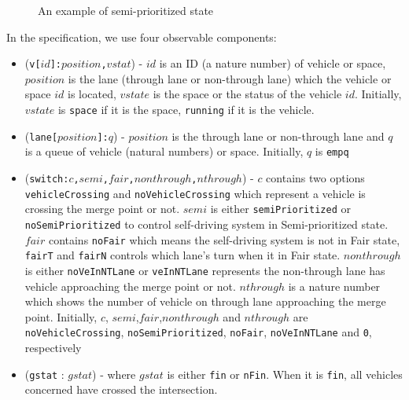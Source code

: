 \documentclass[10pt, conference, compsocconf]{IEEEtran}
\begin{document}
\begin{figure}[h]
\begin{center}
\end{center}
\caption{An example of semi-prioritized state}
\label{space}
\end{figure}
 
 
In the specification, we use four observable components:
\begin{itemize}
    \item (\verb!v[!$id$\verb!]:!$position$\verb!,!$vstat$) - $id$ is an ID (a nature number) of vehicle or space, $position$ is the lane (through lane or non-through lane) which the vehicle or space $id$ is located, $vstate$ is the space or the status of the vehicle $id$. Initially, $vstate$ is \verb!space! if it is the space, \verb!running! if it is the vehicle.
    \item (\verb!lane[!$position$\verb!]:!$q$) - $position$ is the through lane or non-through lane and $q$ is a queue of vehicle (natural numbers) or space. Initially, $q$ is \verb!empq!
    \item (\verb!switch:!$c$\verb!,!$semi$\verb!,!$fair$\verb!,!$nonthrough$\verb!,!$nthrough$) - $c$ contains two options \verb!vehicleCrossing! and \verb!noVehicleCrossing! which represent a vehicle is crossing the merge point or not. 
    $semi$ is either \verb!semiPrioritized! or \verb!noSemiPrioritized! to control self-driving system in Semi-prioritized state. 
    $fair$ contains \verb!noFair! which means the self-driving system is not in Fair state, \verb!fairT! and \verb!fairN! controls which lane's turn when it in Fair state. 
    $nonthrough$ is either \verb!noVeInNTLane! or \verb!veInNTLane! represents the non-through lane has vehicle approaching the merge point or not. 
    $nthrough$ is a nature number which shows the number of vehicle on through lane approaching the merge point.
    Initially, $c$, $semi$,$fair$,$nonthrough$ and $nthrough$ are \verb!noVehicleCrossing!, \verb!noSemiPrioritized!, \verb!noFair!, \verb!noVeInNTLane! and \verb!0!, respectively 
    \item (\verb!gstat! : $gstat$) -  where $gstat$ is either \verb!fin! or \verb!nFin!.
	When it is \verb!fin!, all vehicles concerned have crossed the intersection.
\end{itemize}
\end{document}

